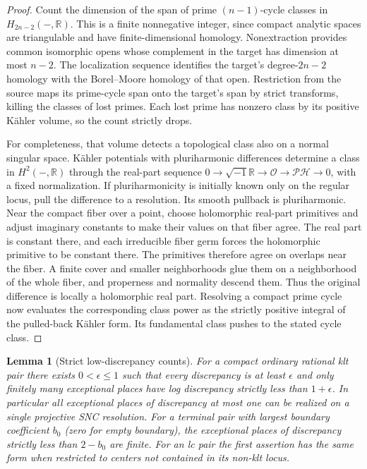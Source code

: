 \documentclass[11pt,letterpaper]{article}
\newtheorem{lemma}[theorem]{Lemma}
\theoremstyle{definition}
\theoremstyle{remark}
\begin{document}
\begin{proof}
Count the dimension of the span of prime $(n-1)$-cycle classes in
$H_{2n-2}(-,\mathbb{R})$.  This is a finite nonnegative integer, since compact
analytic spaces are triangulable and have finite-dimensional homology.
Nonextraction provides common isomorphic opens whose complement in
the target has dimension at most $n-2$.  The localization sequence
identifies the target's degree-$2n-2$ homology with the Borel--Moore
homology of that open.  Restriction from the source maps its prime-cycle
span onto the target's span by strict transforms, killing the classes
of lost primes.  Each lost prime has nonzero class by its positive
K\"ahler volume, so the count strictly drops.

For completeness, that volume detects a topological class also on a
normal singular space.  K\"ahler potentials with pluriharmonic
differences determine a class in $H^2(-,\mathbb{R})$ through the real-part
sequence
$0\to\sqrt{-1}\mathbb{R}\to\mathcal{O}\to\mathcal{PH}\to0$, with a fixed normalization.
If pluriharmonicity is initially known only on the regular locus,
pull the difference to a resolution.  Its smooth pullback is
pluriharmonic.  Near the compact fiber over a point, choose holomorphic
real-part primitives and adjust imaginary constants to make their
values on that fiber agree.  The real part is constant there, and
each irreducible fiber germ forces the holomorphic primitive to be
constant there.  The primitives therefore agree on overlaps near
the fiber.  A finite cover and smaller neighborhoods glue them on a
neighborhood of the whole fiber, and properness and normality descend
them.  Thus the original difference is locally a holomorphic real
part.  Resolving a compact prime cycle now evaluates the corresponding
class power as the strictly positive integral of the pulled-back
K\"ahler form.  Its fundamental class pushes to the stated cycle
class.
\end{proof}

\begin{lemma}[Strict low-discrepancy counts]
\label{bir:low-count}
For a compact ordinary rational klt pair there exists
$0<\epsilon\leq1$ such that every discrepancy is at least $\epsilon$
and only finitely many exceptional places have log discrepancy
strictly less than $1+\epsilon$.  In particular all exceptional places
of discrepancy at most one can be realized on a single projective
SNC resolution.  For a terminal pair with largest boundary
coefficient $b_0$ (zero for empty boundary), the exceptional places
of discrepancy strictly less than $2-b_0$ are finite.  For an lc
pair the first assertion has the same form when restricted to
centers not contained in its non-klt locus.
\end{lemma}
\end{document}
